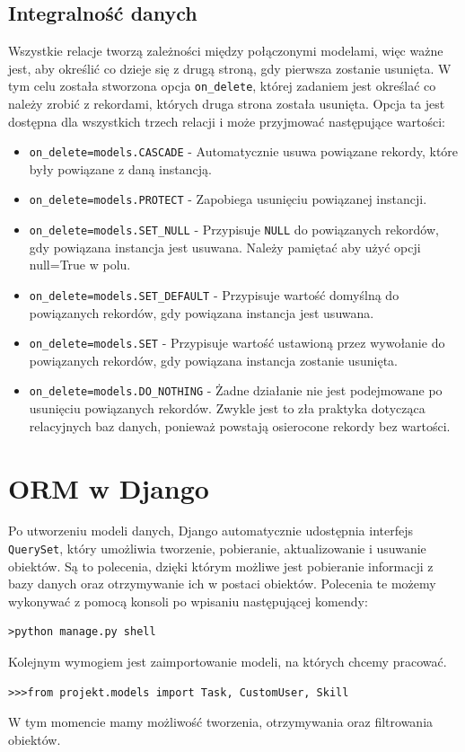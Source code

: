 \documentclass[oneside,polski,logo,indent]{amuthesis}
\begin{document}
\begin{enumerate}
\begin{enumerate}
\subsection{Integralność danych}
Wszystkie relacje tworzą zależności między połączonymi modelami, więc ważne jest, aby określić co dzieje się z drugą stroną, gdy pierwsza zostanie usunięta.
W tym celu została stworzona opcja \texttt{on\_delete}, której zadaniem jest określać co należy zrobić z rekordami, których druga strona została usunięta. Opcja ta jest dostępna dla wszystkich trzech relacji i może przyjmować następujące wartości:
\begin{itemize}
\item \texttt{on\_delete=models.CASCADE} - Automatycznie usuwa powiązane rekordy, które były powiązane z daną instancją.
\item \texttt{on\_delete=models.PROTECT} - Zapobiega usunięciu powiązanej instancji.
\item \texttt{on\_delete=models.SET\_NULL} - Przypisuje \texttt{NULL} do powiązanych rekordów, gdy powiązana instancja jest usuwana. Należy pamiętać aby użyć opcji null=True w polu.
\item \texttt{on\_delete=models.SET\_DEFAULT} - Przypisuje wartość domyślną do powiązanych rekordów, gdy powiązana instancja jest usuwana.
\item \texttt{on\_delete=models.SET} - Przypisuje wartość ustawioną przez wywołanie do powiązanych rekordów, gdy powiązana instancja zostanie usunięta.
\item \texttt{on\_delete=models.DO\_NOTHING} - Żadne działanie nie jest podejmowane po usunięciu powiązanych rekordów. Zwykle jest to zła praktyka dotycząca relacyjnych baz danych, ponieważ powstają osierocone rekordy bez wartości.
\end{itemize}
\section{ORM w Django}
Po utworzeniu modeli danych, Django automatycznie udostępnia interfejs \texttt{QuerySet}, który umożliwia tworzenie, pobieranie, aktualizowanie i usuwanie obiektów. Są to polecenia, dzięki którym możliwe jest pobieranie informacji z bazy danych oraz otrzymywanie ich w postaci obiektów. Polecenia te możemy wykonywać z pomocą konsoli po wpisaniu następującej komendy:
\begin{lstlisting}[style=DOS]
>python manage.py shell
\end{lstlisting}
Kolejnym wymogiem jest zaimportowanie modeli, na których chcemy pracować.
\begin{lstlisting}[style=DOS]
>>>from projekt.models import Task, CustomUser, Skill
\end{lstlisting}
W tym momencie mamy możliwość tworzenia, otrzymywania oraz filtrowania obiektów.

\end{enumerate}
\end{enumerate}
\end{document}
